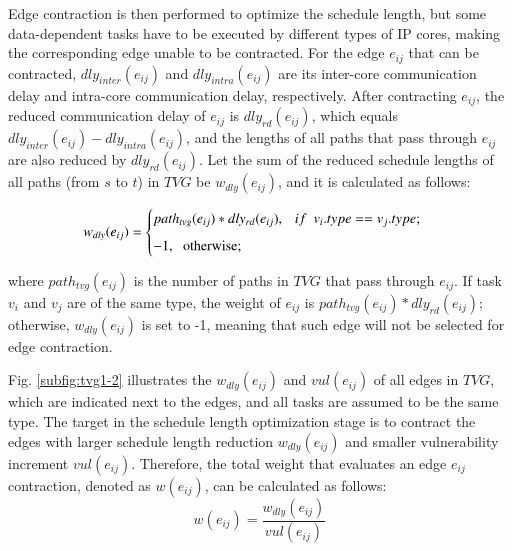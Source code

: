 \documentclass[10pt,journal, compsoc]{IEEEtran}
\begin{document}
Edge contraction is then performed to optimize the schedule length, but some data-dependent tasks have to be executed by different types of IP cores, making the corresponding edge unable to be contracted. For the edge $e_{ij}$ that can be contracted, $dly_{inter}(e_{ij})$ and $dly_{intra}(e_{ij})$ are its inter-core communication delay and intra-core communication delay, respectively. After contracting $e_{ij}$, the reduced communication delay of $e_{ij}$ is $dly_{rd}(e_{ij})$, which equals $dly_{inter}(e_{ij})-dly_{intra}(e_{ij})$, and the lengths of all paths that pass through $e_{ij}$ are also reduced by $dly_{rd}(e_{ij})$. Let the sum of the reduced schedule lengths of all paths (from $s$ to $t$) in $TVG$ be $w_{dly}(e_{ij})$, and it is calculated as follows:

\begin{eqnarray*}
	\begin{split}
		w_{dly}(e_{ij})=
		\begin{cases}
			path_{tvg}(e_{ij})*dly_{rd}(e_{ij}),  ~~~if~~v_i.type==v_j.type; \\[0.5em]
			 -1, ~~~$otherwise$; \\
		\end{cases}
	\end{split}
	\label{pro1}
\end{eqnarray*}

\noindent where $path_{tvg}(e_{ij})$ is the number of paths in $TVG$ that pass through $e_{ij}$. If task $v_i$ and $v_j$ are of the same type, the weight of $e_{ij}$ is $path_{tvg}(e_{ij})*dly_{rd}(e_{ij})$; otherwise, $w_{dly}(e_{ij})$ is set to -1, meaning that such edge will not be selected for edge contraction.

Fig. \ref{subfig:tvg1-2} illustrates the $w_{dly}(e_{ij})$ and $vul(e_{ij})$ of all edges in $TVG$, which are indicated next to the edges, and all tasks are assumed to be the same type. The target in the schedule length optimization stage is to contract the edges with larger schedule length reduction $w_{dly}(e_{ij})$ and smaller vulnerability increment $vul(e_{ij})$. Therefore, the total weight that evaluates an edge $e_{ij}$ contraction, denoted as $w(e_{ij})$, can be calculated as follows:
\begin{equation}
w(e_{ij}) = \frac{w_{dly}(e_{ij})}{vul(e_{ij})}
\label{equ:weight_e}
\end{equation}

\end{document}
